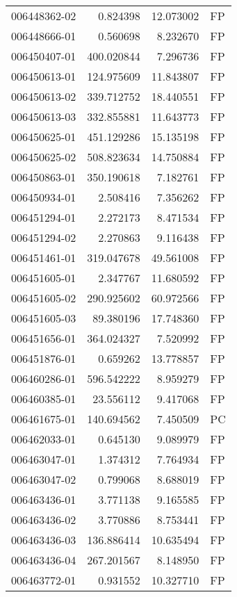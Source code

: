 \begin{tabular}{lrrl}
006448362-02 &    0.824398 &    12.073002 &   FP \\
006448666-01 &    0.560698 &     8.232670 &   FP \\
006450407-01 &  400.020844 &     7.296736 &   FP \\
006450613-01 &  124.975609 &    11.843807 &   FP \\
006450613-02 &  339.712752 &    18.440551 &   FP \\
006450613-03 &  332.855881 &    11.643773 &   FP \\
006450625-01 &  451.129286 &    15.135198 &   FP \\
006450625-02 &  508.823634 &    14.750884 &   FP \\
006450863-01 &  350.190618 &     7.182761 &   FP \\
006450934-01 &    2.508416 &     7.356262 &   FP \\
006451294-01 &    2.272173 &     8.471534 &   FP \\
006451294-02 &    2.270863 &     9.116438 &   FP \\
006451461-01 &  319.047678 &    49.561008 &   FP \\
006451605-01 &    2.347767 &    11.680592 &   FP \\
006451605-02 &  290.925602 &    60.972566 &   FP \\
006451605-03 &   89.380196 &    17.748360 &   FP \\
006451656-01 &  364.024327 &     7.520992 &   FP \\
006451876-01 &    0.659262 &    13.778857 &   FP \\
006460286-01 &  596.542222 &     8.959279 &   FP \\
006460385-01 &   23.556112 &     9.417068 &   FP \\
006461675-01 &  140.694562 &     7.450509 &   PC \\
006462033-01 &    0.645130 &     9.089979 &   FP \\
006463047-01 &    1.374312 &     7.764934 &   FP \\
006463047-02 &    0.799068 &     8.688019 &   FP \\
006463436-01 &    3.771138 &     9.165585 &   FP \\
006463436-02 &    3.770886 &     8.753441 &   FP \\
006463436-03 &  136.886414 &    10.635494 &   FP \\
006463436-04 &  267.201567 &     8.148950 &   FP \\
006463772-01 &    0.931552 &    10.327710 &   FP \\

\end{tabular}
